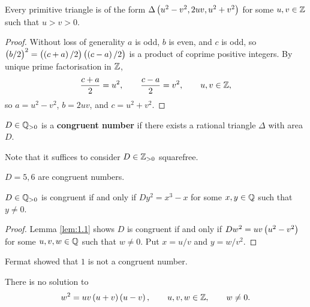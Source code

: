 \begin{lemma}
\label{lem:1.1}
Every primitive triangle is of the form $ \Delta\br{u^2 - v^2, 2uv, u^2 + v^2} $ for some $ u, v \in \mathbb{Z} $ such that $ u > v > 0 $.
\end{lemma}

\begin{proof}
Without loss of generality $ a $ is odd, $ b $ is even, and $ c $ is odd, so $ \br{b / 2}^2 = \br{\br{c + a} / 2}\br{\br{c - a} / 2} $ is a product of coprime positive integers. By unique prime factorisation in $ \mathbb{Z} $,
$$ \dfrac{c + a}{2} = u^2, \qquad \dfrac{c - a}{2} = v^2, \qquad u, v \in \mathbb{Z}, $$
so $ a = u^2 - v^2 $, $ b = 2uv $, and $ c = u^2 + v^2 $.
\end{proof}

\begin{definition*}
$ D \in \mathbb{Q}_{> 0} $ is a \textbf{congruent number} if there exists a rational triangle $ \Delta $ with area $ D $.
\end{definition*}

Note that it suffices to consider $ D \in \mathbb{Z}_{> 0} $ squarefree.

\begin{example*}
$ D = 5, 6 $ are congruent numbers.
\end{example*}

\begin{lemma}
\label{lem:1.2}
$ D \in \mathbb{Q}_{> 0} $ is congruent if and only if $ Dy^2 = x^3 - x $ for some $ x, y \in \mathbb{Q} $ such that $ y \ne 0 $.
\end{lemma}

\begin{proof}
Lemma \ref{lem:1.1} shows $ D $ is congruent if and only if $ Dw^2 = uv\br{u^2 - v^2} $ for some $ u, v, w \in \mathbb{Q} $ such that $ w \ne 0 $. Put $ x = u / v $ and $ y = w / v^2 $.
\end{proof}

Fermat showed that $ 1 $ is not a congruent number.

\begin{theorem}
\label{thm:1.3}
There is no solution to
\begin{equation}
\label{eq:1}
w^2 = uv\br{u + v}\br{u - v}, \qquad u, v, w \in \ZZ, \qquad w \ne 0.
\end{equation}
\end{theorem}

